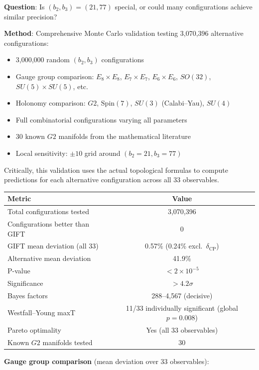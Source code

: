 \documentclass[11pt,a4paper]{article}
\newcommand{\E}{\mathrm{E}}
\newcommand{\Gtwo}{\mathrm{G}_2}
\newcommand{\SU}{\mathrm{SU}}
\newcommand{\SO}{\mathrm{SO}}
\def\Gtwo{G2}%
\def\E{E}%
\def\SU{SU}%
\def\SO{SO}%
\begin{document}
\textbf{Question}: Is $(b_2, b_3) = (21, 77)$ special, or could many configurations achieve similar precision?

\textbf{Method}: Comprehensive Monte Carlo validation testing 3,070,396 alternative configurations:
\begin{itemize}
\item 3,000,000 random $(b_2, b_3)$ configurations
\item Gauge group comparison: $\E_8 \times \E_8$, $\E_7 \times \E_7$, $\E_6 \times \E_6$, $\SO(32)$, $\SU(5) \times \SU(5)$, etc.
\item Holonomy comparison: $\Gtwo$, $\mathrm{Spin}(7)$, $\SU(3)$ (Calabi--Yau), $\SU(4)$
\item Full combinatorial configurations varying all parameters
\item 30 known $\Gtwo$ manifolds from the mathematical literature
\item Local sensitivity: $\pm 10$ grid around $(b_2=21, b_3=77)$
\end{itemize}

Critically, this validation uses the actual topological formulas to compute predictions for each alternative configuration across all 33 observables.

\begin{table}[H]
\centering
\begin{tabular}{lc}
\toprule
Metric & Value \\
\midrule
Total configurations tested & 3,070,396 \\
Configurations better than GIFT & 0 \\
GIFT mean deviation (all 33) & 0.57\% (0.24\% excl.\ $\delta_{\mathrm{CP}}$) \\
Alternative mean deviation & 41.9\% \\
P-value & $< 2 \times 10^{-5}$ \\
Significance & $> 4.2\sigma$ \\
Bayes factors & 288--4{,}567 (decisive) \\
Westfall--Young maxT & 11/33 individually significant (global $p = 0.008$) \\
Pareto optimality & Yes (all 33 observables) \\
Known $\Gtwo$ manifolds tested & 30 \\
\bottomrule
\end{tabular}
\end{table}

\textbf{Gauge group comparison} (mean deviation over 33 observables):
\end{document}
